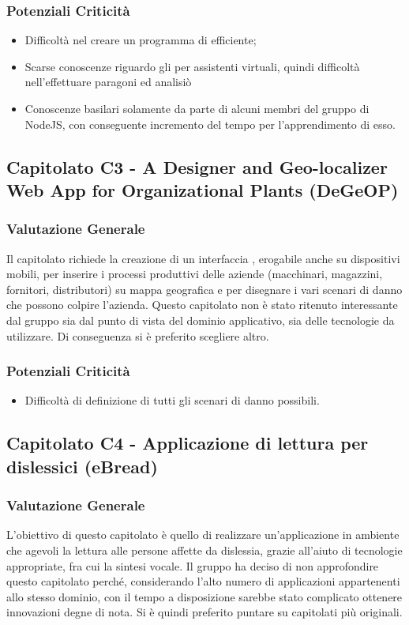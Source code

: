      \subsubsection{Potenziali Criticità}
      \begin{itemize}
       \item Difficoltà nel creare un programma di  efficiente;
       \item Scarse conoscenze riguardo gli  per assistenti virtuali, quindi difficoltà nell'effettuare paragoni ed analisiò
       \item Conoscenze basilari solamente da parte di alcuni membri del gruppo di NodeJS, con conseguente incremento del tempo per l'apprendimento di esso.
      \end{itemize}
  \subsection{Capitolato C3 - A Designer and Geo-localizer Web App for Organizational Plants (DeGeOP)}
    \subsubsection{Valutazione Generale}
    Il capitolato richiede la creazione di un interfaccia , erogabile anche su dispositivi mobili, per inserire i processi produttivi delle aziende (macchinari, magazzini, fornitori, distributori) su mappa geografica e per disegnare i vari scenari di danno che possono colpire l'azienda. 
    Questo capitolato non è stato ritenuto interessante dal gruppo sia dal punto di vista del dominio applicativo, sia delle tecnologie da utilizzare. Di conseguenza si è preferito scegliere altro.
    \subsubsection{Potenziali Criticità}
    \begin{itemize}
     \item Difficoltà di definizione di tutti gli scenari di danno possibili.
    \end{itemize}
\subsection{Capitolato C4 - Applicazione di lettura per dislessici (eBread)}
    \subsubsection{Valutazione Generale}
    L'obiettivo di questo capitolato è quello di realizzare un'applicazione in ambiente  che agevoli la lettura alle persone affette da dislessia, grazie all'aiuto di tecnologie appropriate, fra cui la sintesi vocale.
Il gruppo ha deciso di non approfondire questo capitolato perché, considerando l'alto numero di applicazioni appartenenti allo stesso dominio, con il tempo a disposizione sarebbe stato complicato ottenere innovazioni degne di nota. Si è quindi preferito puntare su capitolati più originali.
